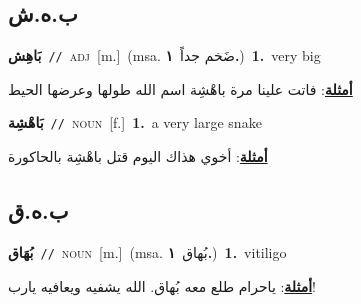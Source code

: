 \documentclass[10pt,a4paper,twoside]{article} %
\begin{document}
\begin{multicols}{2}
\vspace{-3mm}
\subsection*{\color{blue}\foreignlanguage{arabic}{ب.ه.ش}\color{blue}{}} 

{\setlength\topsep{0pt}\textbf{\foreignlanguage{arabic}{بَاهِش}}\ {\color{gray}\texttt{//}\color{black}}\ \textsc{adj}\ [m.]\ \color{gray}(msa. \foreignlanguage{arabic}{ضَخم جداً}~\foreignlanguage{arabic}{\textbf{١.}})\color{black}\ \textbf{1.}~very big\  \begin{flushright}\color{gray}\foreignlanguage{arabic}{\textbf{\underline{\foreignlanguage{arabic}{أمثلة}}}: فاتت علينا مرة باهْشِة اسم الله طولها وعرضها الحيط}\end{flushright}\color{black}} \vspace{2mm}

{\setlength\topsep{0pt}\textbf{\foreignlanguage{arabic}{بَاهْشِة}}\ {\color{gray}\texttt{//}\color{black}}\ \textsc{noun}\ [f.]\ \textbf{1.}~a very large snake\  \begin{flushright}\color{gray}\foreignlanguage{arabic}{\textbf{\underline{\foreignlanguage{arabic}{أمثلة}}}: أخوي هذاك اليوم قتل باهْشِة بالحاكورة}\end{flushright}\color{black}} \vspace{2mm}

\vspace{-3mm}
\subsection*{\color{blue}\foreignlanguage{arabic}{ب.ه.ق}\color{blue}{}} 

{\setlength\topsep{0pt}\textbf{\foreignlanguage{arabic}{بُهَاق}}\ {\color{gray}\texttt{//}\color{black}}\ \textsc{noun}\ [m.]\ \color{gray}(msa. \foreignlanguage{arabic}{بُهاق}~\foreignlanguage{arabic}{\textbf{١.}})\color{black}\ \textbf{1.}~vitiligo\  \begin{flushright}\color{gray}\foreignlanguage{arabic}{\textbf{\underline{\foreignlanguage{arabic}{أمثلة}}}: ياحرام طلع معه بُهاق. الله يشفيه ويعافيه يارب!}\end{flushright}\color{black}} \vspace{2mm}


\end{multicols}
\end{document}
